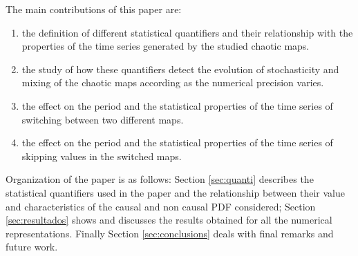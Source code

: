 The main contributions of this paper are:
\begin{enumerate}
\item the definition of different statistical quantifiers and their relationship with the properties of the time series generated by the studied chaotic maps.
\item the study of how these quantifiers detect the evolution of stochasticity and mixing of the chaotic maps according as the numerical precision varies.
\item the effect on the period and the statistical properties of the time series of switching between two different maps.
\item the effect on the period and the statistical properties of the time series of skipping values in the switched maps.
\end{enumerate}

Organization of the paper is as follows:
Section \ref{sec:quanti} describes the statistical quantifiers used in the paper and the relationship between their value and characteristics of the causal and non causal PDF considered;
Section \ref{sec:resultados} shows and discusses the results obtained for all the numerical representations.
Finally Section \ref{sec:conclusions} deals with final remarks and future work.